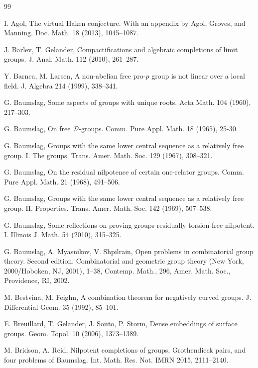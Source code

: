 \documentclass[11pt]{amsart}
\numberwithin{claimcounter}{lem}
\begin{document}
   \begin{thebibliography}{99}
   
    I. Agol, 
The virtual Haken conjecture.  
With an appendix by Agol, Groves, and Manning.
Doc. Math. 18 (2013), 1045--1087. 
   
    J. Barlev, T. Gelander, 
Compactifications and algebraic completions of limit groups.
J. Anal. Math. 112 (2010), 261--287. 
  
    Y. Barnea, M. Larsen,  A non-abelian free pro-$p$ group is not linear over a local field. J. Algebra 214 (1999),  338--341. 
  
    G. Baumslag,  Some aspects of groups with unique roots. Acta Math. 104 (1960), 217--303.
  
    G. Baumslag,   On free $\mathcal D$-groups. Comm. Pure Appl. Math. 18 (1965), 25-30.
  
      G. Baumslag, Groups with the same lower central sequence as a relatively free group. I. The groups. Trans. Amer. Math. Soc. 129 (1967), 308--321. 
  
      G. Baumslag,  On the residual nilpotence of certain one-relator groups. Comm. Pure Appl. Math. 21 (1968), 491--506. 
  
   G. Baumslag,   Groups with the same lower central sequence as a relatively free group. II. Properties. Trans. Amer. Math. Soc. 142 (1969), 507--538. 
  
    G. Baumslag,  Some reflections on proving groups residually torsion-free nilpotent. I. Illinois J. Math. 54 (2010),  315--325. 
  
    G. Baumslag, A. Myasnikov, V.  Shpilrain,   Open problems in combinatorial group theory. Second edition. Combinatorial and geometric group theory (New York, 2000/Hoboken, NJ, 2001), 1--38, Contemp. Math., 296, Amer. Math. Soc., Providence, RI, 2002. 
  
    M. Bestvina,  M. Feighn,  A combination theorem for negatively curved groups. J. Differential Geom. 35 (1992),  85--101.
  
  E. Breuillard,  T. Gelander, J. Souto,  P. Storm, Dense embeddings of surface groups. 
Geom. Topol. 10 (2006), 1373--1389. 
  
    M. Bridson,  A. Reid,  Nilpotent completions of groups, Grothendieck pairs, and four problems of Baumslag. Int. Math. Res. Not. IMRN 2015,  2111--2140. 


\end{thebibliography}
\end{document}
